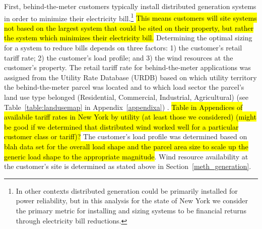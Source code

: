 First, behind-the-meter customers typically install distributed generation systems in order to minimize their electricity bill.\footnote{In other contexts distributed generation could be primarily installed for power reliability, but in this analysis for the state of New York we consider the primary metric for installing and sizing systems to be financial returns through electricity bill reductions.} \hl{This means customers will site systems not based on the largest system that could be sited on their property, but rather the system which minimizes their electricity bill.} Determining the optimal sizing for a system to reduce bills depends on three factors: 1) the customer's retail tariff rate; 2) the customer's load profile; and 3) the wind resources at the customer's property. The retail tariff rate for behind-the-meter applications was assigned from the Utility Rate Database (URDB) based on which utility territory the behind-the-meter parcel was located and to which load sector the parcel's land use type belonged (Residential, Commercial, Industrial, Agricultural) (see Table~\ref{table:landusemap} in Appendix~\ref{appendixa}) \cite{open_energy_information_utility_2020}. \hl{Table in Appendices of availabile tariff rates in New York by utility (at least those we considered) (might be good if we determined that distributed wind worked well for a particular customer class or tariff)?} The customer's load profile was determined based on \hl{blah data set for the overall load shape and the parcel area size to scale up the generic load shape to the appropriate magnitude}. Wind resource availability at the customer's site is determined as stated above in Section~\ref{meth_generation}.

